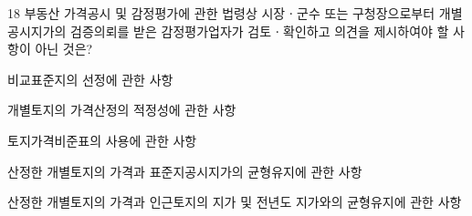 \begin{question}{18}
부동산 가격공시 및 감정평가에 관한 법령상 시장ㆍ군수 또는 구청장으로부터 개별공시지가의 검증의뢰를 받은 감정평가업자가 검토ㆍ확인하고 의견을 제시하여야 할 사항이 아닌 것은?
\begin{choices}
  \item 비교표준지의 선정에 관한 사항
  \item 개별토지의 가격산정의 적정성에 관한 사항
  \item 토지가격비준표의 사용에 관한 사항
  \item 산정한 개별토지의 가격과 표준지공시지가의 균형유지에 관한 사항
  \item 산정한 개별토지의 가격과 인근토지의 지가 및 전년도 지가와의 균형유지에 관한 사항
\end{choices}
\end{question}
